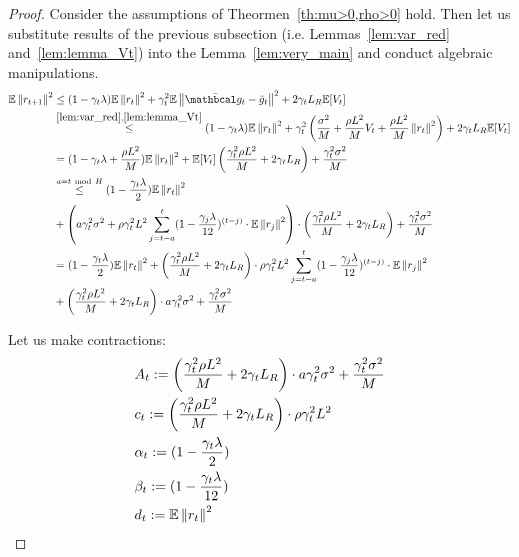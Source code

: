 \begin{proof}
    Consider the assumptions of Theormen~\ref{th:mu>0,rho>0} hold. Then let us substitute results of the previous subsection (i.e. Lemmas~\ref{lem:var_red}
and~\ref{lem:lemma_Vt}) into the Lemma~\ref{lem:very_main} and conduct algebraic manipulations.
\begin{align}
    \E \norm{r_{t+1}}^2
    &\leq (1 - \gamma_{t} \lambda) \E \norm{r_t}^2 
    + \gamma_{t}^2 \E \norm{ \bar{\mc{g_t}} - \bar{g}_t}^2
    + 2 \gamma_{t} L_R \E [V_t] \\
    &\overset{\ref{lem:var_red}, \ref{lem:lemma_Vt}}{\leq}
    (1 - \gamma_{t} \lambda) \E \norm{r_t}^2 
    + \gamma_{t}^2 \left(  \frac{\sigma^2}{M} + \frac{\rho L^2 }{M} V_t + \frac{\rho L^2 }{M} \norm{r_t}^2  \right) + 2 \gamma_{t} L_R \E [V_t] \\
    &= (1 - \gamma_{t} \lambda + \frac{\rho L^2}{M}) \E \norm{r_t}^2 + \E [V_t] \left( \frac{\gamma_{t}^2 \rho L^2}{M} + 2 \gamma_{t} L_R \right) + \frac{\gamma_{t}^2 \sigma^2}{M} \\
    &\overset{a = t\ \text{mod}\ H}{\leq}
    (1 - \frac{\gamma_{t} \lambda}{2}) \E \norm{r_t}^2 \\
    &+ \left( a \gamma_{t}^2 \sigma^2 +
        \rho \gamma_{t}^2 L^2 \summ{j=t-a}{t}
        (1 - \frac{\gamma_{j} \lambda} {12})^{(t-j)}
        \cdot \E \norm{r_j}^2 \right) 
        \cdot 
        \left( \frac{\gamma_{t}^2 \rho L^2}{M} + 2 \gamma_{t} L_R \right) 
        + \frac{\gamma_{t}^2 \sigma^2}{M} \\
    &= (1 - \frac{\gamma_{t} \lambda}{2}) \E \norm{r_t}^2 + \left( \frac{\gamma_{t}^2 \rho L^2}{M} + 2 \gamma_{t} L_R \right) 
    \cdot 
    \rho \gamma_{t}^2 L^2 \summ{j=t-a}{t}
    (1 - \frac{\gamma_{j} \lambda} {12})^{(t-j)}
    \cdot \E \norm{r_j}^2 \\
    &+ \left( \frac{\gamma_{t}^2 \rho L^2}{M} + 2 \gamma_{t} L_R \right) \cdot a \gamma_{t}^2 \sigma^2 + \frac{\gamma_{t}^2 \sigma^2}{M} \label{eq:2604_1}
\end{align}

Let us make contractions:
    \begin{align}
        &A_{t} := \left( \frac{\gamma_{t}^2 \rho L^2}{M} + 2 \gamma_{t} L_R \right) \cdot a \gamma_{t}^2 \sigma^2 + \frac{\gamma_{t}^2 \sigma^2}{M} \\
        &c_{t} := \left( \frac{\gamma_{t}^2 \rho L^2}{M} + 2 \gamma_{t} L_R \right) 
        \cdot 
        \rho \gamma_{t}^2 L^2 \\
        &\alpha_{t} := (1 - \frac{\gamma_{t} \lambda}{2}) \\
        &\beta_{t} := (1 - \frac{\gamma_{t} \lambda}{12}) \label{eq:beta_def} \\
        &d_t := \mathbb{E} \left\|r_t\right\|^2
    \end{align}


\end{proof}
